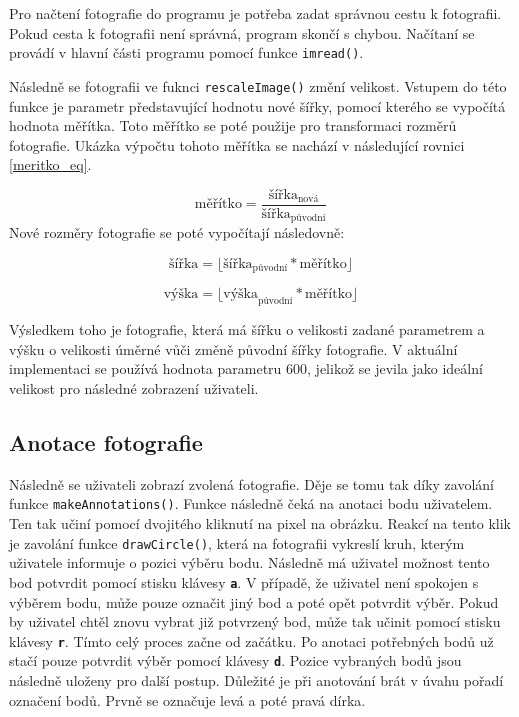 Pro načtení fotografie do programu je potřeba zadat správnou cestu k fotografii. Pokud cesta k fotografii není správná, program skončí s chybou. Načítaní se provádí v hlavní části programu pomocí funkce \texttt{imread()}.

Následně se fotografii ve fuknci \texttt{rescaleImage()} změní velikost. Vstupem do této funkce je parametr představující hodnotu nové šířky, pomocí kterého se vypočítá hodnota měřítka. Toto měřítko se poté použije pro transformaci rozměrů fotografie. Ukázka výpočtu tohoto měřítka se nachází v následující rovnici \ref{meritko_eq}. 

\begin{equation}
    \text{měřítko} = \frac{\text{šířka}_{\text{nová}}}{\text{šířka}_{\text{původní}}}
    \label{meritko_eq}
\end{equation}
Nové rozměry fotografie se poté vypočítají následovně:

\begin{equation}
    \text{šířka} = \lfloor \text{šířka}_{\text{původní}} * \text{měřítko} \rfloor
\end{equation}

\begin{equation}
    \text{výška} = \lfloor \text{výška}_{\text{původní}} * \text{měřítko} \rfloor
\end{equation}

Výsledkem toho je fotografie, která má šířku o velikosti zadané parametrem a výšku o velikosti úměrné vůči změně původní šířky fotografie. V aktuální implementaci se používá hodnota parametru 600, jelikož se jevila jako ideální velikost pro následné zobrazení uživateli. 


\subsection{Anotace fotografie}
Následně se uživateli zobrazí zvolená fotografie. Děje se tomu tak díky zavolání funkce \texttt{makeAnnotations()}. Funkce následně čeká na anotaci bodu uživatelem. Ten tak učiní pomocí dvojitého kliknutí na pixel na obrázku. Reakcí na tento klik je zavolání funkce \texttt{drawCircle()}, která na fotografii vykreslí kruh, kterým uživatele informuje o pozici výběru bodu. Následně má uživatel možnost tento bod potvrdit pomocí stisku klávesy \texttt{\textbf{a}}. V případě, že uživatel není spokojen s výběrem bodu, může pouze označit jiný bod a poté opět potvrdit výběr. Pokud by uživatel chtěl znovu vybrat již potvrzený bod, může tak učinit pomocí stisku klávesy \texttt{\textbf{r}}. Tímto celý proces začne od začátku. Po anotaci potřebných bodů už stačí pouze potvrdit výběr pomocí klávesy \texttt{\textbf{d}}. Pozice vybraných bodů jsou následně uloženy pro další postup. Důležité je při anotování brát v úvahu pořadí označení bodů. Prvně se označuje levá a poté pravá dírka.


